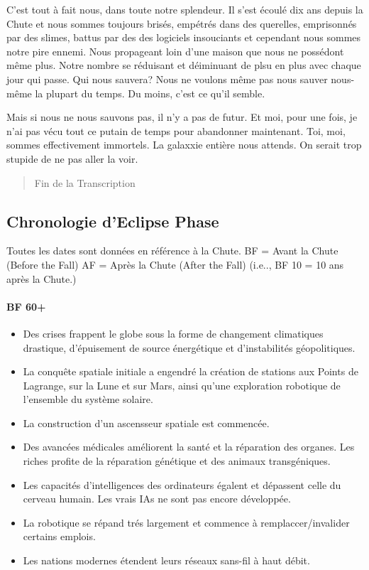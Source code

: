 C'est tout à fait nous, dans toute notre splendeur. Il s'est écoulé dix ans depuis la Chute et nous sommes toujours brisés, empétrés dans des querelles, emprisonnés par des slimes, battus par des des logiciels insouciants et cependant nous sommes notre pire ennemi. Nous propageant loin d'une maison que nous ne possédont même plus. Notre nombre se réduisant et déiminuant de plsu en plus avec chaque jour qui passe. Qui nous sauvera? Nous ne voulons même pas nous sauver nous-même la plupart du temps. Du moins, c'est ce qu'il semble. 

Mais si nous ne nous sauvons pas, il n'y a pas de futur. Et moi, pour une fois, je n'ai pas vécu tout ce putain de temps pour abandonner maintenant. Toi, moi, sommes effectivement immortels. La galaxxie entière nous attends. On serait trop stupide de ne pas aller la voir. 

\begin{quotation}
   Fin de la Transcription
\end{quotation} 

\subsection{Chronologie d'Eclipse Phase} \label{sec:eclipse-phase-timel} 

Toutes les dates sont données en référence à la Chute. BF = Avant la Chute
(Before the Fall) AF = Après la Chute (After the Fall) (i.e.., BF 10 = 10 ans
après la Chute.)

\paragraph{BF 60+} 

\begin{itemize}

   \item Des crises frappent le globe sous la forme de changement climatiques
      drastique, d'épuisement de source énergétique et d'instabilités
      géopolitiques. 
   \item La conquête spatiale initiale a engendré la création de stations aux
      Points de Lagrange, sur la Lune et sur Mars, ainsi qu'une exploration
      robotique de l'ensemble du système solaire. 
   \item La construction d'un ascensseur spatiale est commencée. 
   \item Des avancées médicales améliorent la santé et la réparation des
      organes. Les riches profite de la réparation génétique et des animaux
      transgéniques. 
   \item Les capacités d'intelligences des ordinateurs égalent et dépassent
      celle du cerveau humain. Les vrais IAs ne sont pas encore développée. 
   \item La robotique se répand trés largement et commence à
      remplaccer/invalider certains emplois. 
   \item Les nations modernes étendent leurs réseaux sans-fil à haut débit.
\end{itemize} 

